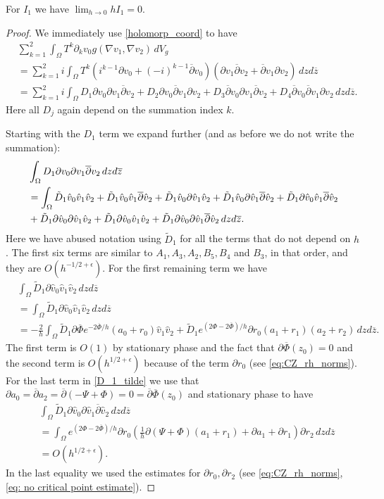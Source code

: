 \documentclass[10pt,a4paper]{amsart}
\newcommand {\p} {\partial}
\newcommand{\Om}{\Omega}
\newcommand{\dbar}{\ol{\p}}
\newcommand{\e}{\epsilon}
\newcommand{\ol}[1]{\overline{#1}}
\newcommand{\oz}{\overline{z}}
\begin{document}
\begin{lem}\label{lemma_D}
	For $I_1$ we have $\lim_{h\to 0} hI_1=0.$
\end{lem}

\begin{proof}
	We immediately use \eqref{holomorp_coord} to have
	\begin{align*}
		&\sum_{k=1}^{2} \int_{\Om} T^k\p_kv_0g(\nabla v_1, \nabla v_2)\,dV_g\\
		&= \sum_{k=1}^2 i \int_{\Om} T^k\left(i^{k-1}\p v_0 + (-i)^{k-1}\dbar v_0\right)\left(\p v_1 \dbar v_2 + \dbar v_1\p v_2\right)\,dzd\oz\\
		&= \sum_{k=1}^2 i \int_{\Om} D_1\p v_0 \p v_1\dbar v_2 + D_2\p v_0 \dbar v_1\p v_2 + D_3\dbar v_0 \p v_1\dbar v_2 + D_4\dbar v_0 \dbar v_1\p v_2\,dzd\oz.
	\end{align*}
	Here all $D_j$ again depend on the summation index $k$.
	
	Starting with the $D_1$ term we expand further (and as before we do not write the summation):
	\begin{align}\label{D_1_tilde}
		&\int_{\Om} D_1\p v_0 \p v_1\dbar v_2\,dzd\oz\\\notag
		&= \int_{\Om}\tilde D_1 \hat{v}_0\hat{v}_1\hat{v}_2 + \tilde D_1\hat{v}_0\hat{v}_1\dbar \hat{v}_2 + \tilde D_1\hat{v}_0\p \hat{v}_1 \hat{v}_2 + \tilde D_1\hat{v}_0\p \hat{v}_1\dbar \hat{v}_2 + \tilde D_1 \p \hat{v}_0\hat{v}_1\dbar \hat{v}_2 \\\notag
		&+ \tilde D_1\p \hat{v}_0\p \hat{v}_1 \hat{v}_2 + \tilde D_1 \p \hat{v}_0\hat{v}_1\hat{v}_2 + \tilde D_1\p \hat{v}_0 \p \hat{v}_1\dbar \hat{v}_2\,dzd\oz.
	\end{align}
	Here we have abused notation using $\tilde D_1$ for all the terms that do not depend on $h$. The first six terms are similar to $A_1, A_3, A_2, B_5, B_4$ and $B_3$, in that order, and they are $O(h^{-1/2+\e})$. For the first remaining term we have
	\begin{align*}
		&\int_{\Om}\tilde D_1 \p \hat{v}_0\hat{v}_1\hat{v}_2\,dzd\oz\\
		&= \int_{\Om}\tilde D_1 \p \hat{v}_0 \hat{v}_1\hat{v}_2\,dzd\oz\\
		&=-\frac{2}{h}\int_{\Om}\tilde D_1 \p\ol{\Phi} e^{-2\ol{\Phi}/h}(a_0+r_0)\hat{v}_1\hat{v}_2 + \tilde D_1e^{(2\Phi - 2\ol{\Phi})/h}\p r_0(a_1 + r_1)(a_2 + r_2)\,dzd\oz.
	\end{align*}
	The first term is $O(1)$ by stationary phase and the fact that $\p\ol{\Phi}(z_0)=0$ and the second term is $O(h^{1/2+\e})$ because of the term $\p r_0$ (see \eqref{eq:CZ_rh_norms}). For the last term in \eqref{D_1_tilde} we use that $\p a_0 =\dbar a_2 = \dbar(-\Psi + \Phi)=0=\dbar\ol{\Phi}(z_0)$ and stationary phase to have
	\begin{align*}
		&\int_{\Om}\tilde D_1\p \hat{v}_0\p \hat{v}_1\dbar \hat{v}_2\,dzd\oz\\
		&= \int_{\Om}e^{(2\Phi-2\ol{\Phi})/h}\p r_0\left(\frac{1}{h}\p(\Psi+\Phi)(a_1+r_1) + \p a_1 + \p r_1\right)\p r_2\,dzd\oz\\
		&= O(h^{1/2+\e}).
	\end{align*}
	In the last equality we used the estimates for $\p r_0, \p r_2$ (see \eqref{eq:CZ_rh_norms}, \eqref{eq: no critical point estimate}).
	

\end{proof}
\end{document}
